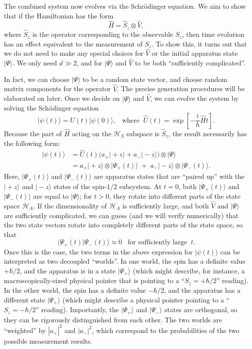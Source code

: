 \documentclass[pra,12pt]{revtex4}
\begin{document}
The combined system now evolves via the Schr\"odinger equation.  We
aim to show that if the Hamiltonian has the form
$$\hat{H} = \hat{S}_z \otimes \hat{V},$$
where $\hat{S}_z$ is the operator corresponding to the observable
$S_z$, then time evolution has an effect equivalent to the measurement
of $S_z$.  To show this, it turns out that we do not need to make any
special choices for $\hat{V}$ or the initial apparatus state
$|\Psi\rangle$.  We only need $d \gg 2$, and for $|\Psi\rangle$ and
$\hat{V}$ to be both ``sufficiently complicated''.

In fact, we can choose $|\Psi\rangle$ to be a random state vector, and
choose random matrix components for the operator $\hat{V}$.  The
precise generation procedures will be elaborated on later.  Once we
decide on $|\Psi\rangle$ and $\hat{V}$, we can evolve the system by
solving the Sch\"odinger equation
$$|\psi(t)\rangle = U(t)|\psi(0)\rangle, \;\;\;\mathrm{where}\;\; \hat{U}(t) = \exp\left[-\frac{i}{\hbar}\hat{H}t\right].$$
Because the part of $\hat{H}$ acting on the $\mathscr{H}_S$ subspace
is $\hat{S}_z$, the result necessarily has the following form:
$$\begin{aligned}|\psi(t)\rangle &= \hat{U}(t)\Big(a_+ |\!+\!z\rangle + a_- |\!-\!z\rangle\Big) \otimes |\Psi\rangle \\ &= a_+ |\!+\!z\rangle \otimes |\Psi_+(t)\rangle \;+\; a_- |\!-\!z\rangle \otimes |\Psi_-(t)\rangle. \end{aligned}$$
Here, $|\Psi_+(t)\rangle$ and $|\Psi_-(t)\rangle$ are apparatus states
that are ``paired up'' with the $|\!+\!z\rangle$ and $|\!-\!z\rangle$
states of the spin-$1/2$ subsystem.  At $t=0$, both
$|\Psi_+(t)\rangle$ and $|\Psi_-(t)\rangle$ are equal to
$|\Psi\rangle$; for $t > 0$, they rotate into different parts of the
state space $\mathscr{H}_A$.  If the dimensionality of $\mathscr{H}_A$
is sufficiently large, and both $\hat{V}$ and $|\Psi\rangle$ are
sufficiently complicated, we can guess (and we will verify numerically) that
the two state vectors rotate into completely different parts of
the state space, so that
$$\langle\Psi_+(t) | \Psi_-(t)\rangle \approx 0 \;\;\;\textrm{for sufficiently large}\;\; t.$$
Once this is the case, the two terms in the above expression for
$|\psi(t)\rangle$ can be interpreted as two decoupled ``worlds''.  In
one world, the spin has a definite value $+\hbar/2$, and the apparatus
is in a state $|\Psi_+\rangle$ (which might describe, for instance, a
macroscopically-sized physical pointer that is pointing to a ``$S_z =
+\hbar/2$'' reading).  In the other world, the spin has a definite
value $-\hbar/2$, and the apparatus has a different state
$|\Psi_+\rangle$ (which might describe a physical pointer pointing to
a ``$S_z = -\hbar/2$'' reading).  Importantly, the $|\Psi_+\rangle$
and $|\Psi_-\rangle$ states are orthogonal, so they can be rigorously
distinguished from each other.  The two worlds are
``weighted'' by $|a_+|^2$ and $|a_-|^2$, which correspond to the
probabilities of the two possible measurement results.
\end{document}

